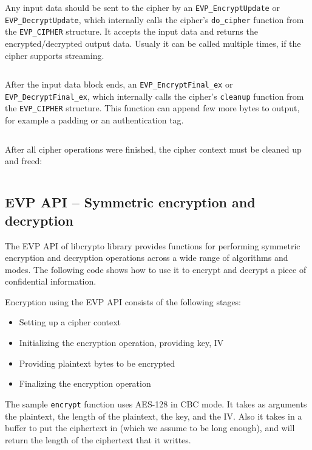 \inputminted{c}{code/openssl-evp-cipherinit.c}

Any input data should be sent to the cipher by an \texttt{EVP\_EncryptUpdate} or \texttt{EVP\_DecryptUpdate}, which internally calls the cipher's \texttt{do\_cipher} function from the \texttt{EVP\_CIPHER} structure. It accepts the input data and returns the encrypted/decrypted output data. Usualy it can be called multiple times, if the cipher supports streaming.

\inputminted{c}{code/openssl-evp-cipherupdate.c}

After the input data block ends, an \texttt{EVP\_EncryptFinal\_ex} or \texttt{EVP\_DecryptFinal\_ex}, which internally calls the cipher's \texttt{cleanup} function from the \texttt{EVP\_CIPHER} structure. This function can append few more bytes to output, for example a padding or an authentication tag.

\inputminted{c}{code/openssl-evp-cipherfinal.c}

After all cipher operations were finished, the cipher context must be cleaned up and freed:

\inputminted{c}{code/openssl-evp-cipher-ctx-free.c}


\subsection{EVP API -- Symmetric encryption and decryption}
\label{toc/openssl-evp-encryption}

The EVP API of libcrypto library provides functions for performing symmetric encryption and decryption operations across a wide range of algorithms and modes. The following code shows how to use it to encrypt and decrypt a piece of confidential information.

Encryption using the EVP API consists of the following stages:

\begin{itemize}
  \item Setting up a cipher context
  \item Initializing the encryption operation, providing key, IV
  \item Providing plaintext bytes to be encrypted
  \item Finalizing the encryption operation
\end{itemize}

The sample \texttt{encrypt} function uses AES-128 in CBC mode. It takes as arguments the plaintext, the length of the plaintext, the key, and the IV. Also it takes in a buffer to put the ciphertext in (which we assume to be long enough), and will return the length of the ciphertext that it writtes.

